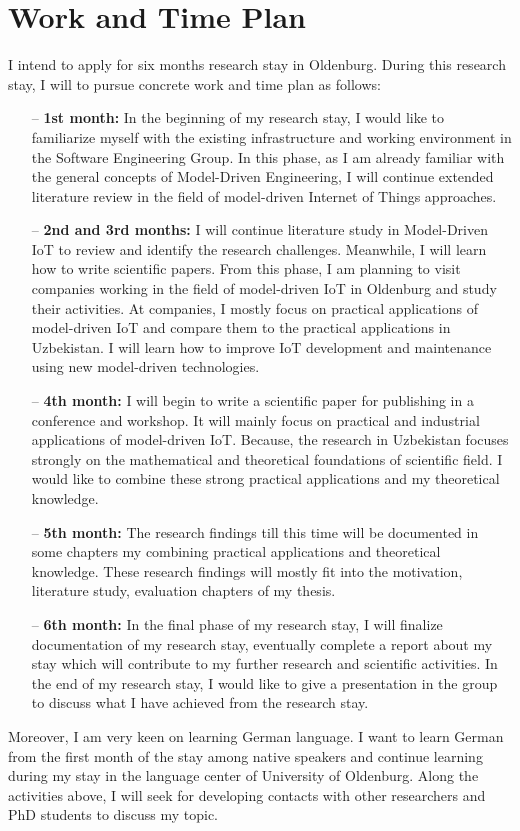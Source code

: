 \documentclass[10pt, oneside]{article}
\begin{document}
\section{Work and Time Plan}
I intend to apply for six months research stay in Oldenburg. During this research stay, I will to pursue concrete work and time plan as follows:
\begin{itemize}
\item[--] \textbf{1st month:} In the beginning of my research stay, I would like to familiarize myself with the existing infrastructure and working environment in the Software Engineering Group. In this phase, as I am already familiar with the general concepts of Model-Driven Engineering, I will continue extended literature review in the field of model-driven Internet of Things approaches.
\item[--] \textbf{2nd and 3rd months:} I will continue literature study in Model-Driven IoT to review and identify the research challenges. Meanwhile, I will learn how to write scientific papers. From this phase, I am planning to visit companies working in the field of model-driven IoT in Oldenburg and study their activities. At companies, I mostly focus on practical applications of model-driven IoT and compare them to the practical applications in Uzbekistan. I will learn how to improve IoT development and maintenance using new model-driven technologies.
\item[--] \textbf{4th month:} I will begin to write a scientific paper for publishing in a conference and workshop. It will mainly focus on practical and industrial applications of model-driven IoT. Because, the research in Uzbekistan focuses strongly on the mathematical and theoretical foundations of scientific field. I would like to combine these strong practical applications and my theoretical knowledge.
\item[--] \textbf{5th month:} The research findings till this time will be documented in some chapters my  combining practical applications and theoretical knowledge. These research findings will mostly fit into the motivation, literature study, evaluation chapters of my thesis.
\item[--] \textbf{6th month:} In the final phase of my research stay, I will finalize documentation of my research stay, eventually complete a report about my stay which will contribute to my further research and scientific activities. In the end of my research stay, I would like to give a presentation in the group to discuss what I have achieved from the research stay.
\end{itemize}
Moreover, I am very keen on learning German language. I want to learn German from the first month of the stay among native speakers and continue learning during my stay in the language center of University of Oldenburg. Along the activities above, I will seek for developing contacts with other researchers and PhD students to discuss my topic.
\end{document}
